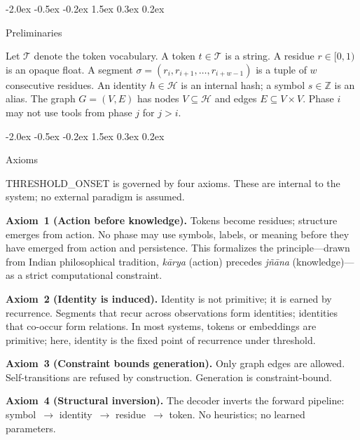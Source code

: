 \documentclass[10pt]{article}
\makeatletter
\renewcommand{\section}{\@startsection{section}{1}{\z@}%
  {-2.0ex \@plus -0.5ex \@minus -0.2ex}%
  {1.5ex \@plus 0.3ex \@minus 0.2ex}%
  {\large\bfseries\raggedright}}
\makeatother
\begin{document}
\section{Preliminaries}
\label{sec:prelim}

Let $\mathcal{T}$ denote the token vocabulary. A token $t \in \mathcal{T}$ is a string.
A residue $r \in [0, 1)$ is an opaque float. A segment
$\sigma = (r_i, r_{i+1}, \ldots, r_{i+w-1})$ is a tuple of $w$ consecutive residues.
An identity $h \in \mathcal{H}$ is an internal hash; a symbol $s \in \mathbb{Z}$ is an
alias. The graph $G = (V, E)$ has nodes $V \subseteq \mathcal{H}$ and edges
$E \subseteq V \times V$. Phase $i$ may not use tools from phase $j$ for $j > i$.

\section{Axioms}
\label{sec:axioms}

THRESHOLD\_ONSET is governed by four axioms. These are internal to the system;
no external paradigm is assumed.

\textbf{Axiom~1 (Action before knowledge).}
Tokens become residues; structure emerges from action. No phase may use symbols,
labels, or meaning before they have emerged from action and persistence. This formalizes
the principle---drawn from Indian philosophical tradition,
\textit{k\={a}rya} (action) precedes \textit{j\~{n}\={a}na} (knowledge)---as a
strict computational constraint.

\textbf{Axiom~2 (Identity is induced).}
Identity is not primitive; it is earned by recurrence. Segments that recur across
observations form identities; identities that co-occur form relations. In most systems,
tokens or embeddings are primitive; here, identity is the fixed point of recurrence
under threshold.

\textbf{Axiom~3 (Constraint bounds generation).}
Only graph edges are allowed. Self-transitions are refused by construction.
Generation is constraint-bound.

\textbf{Axiom~4 (Structural inversion).}
The decoder inverts the forward pipeline:
symbol~$\rightarrow$ identity~$\rightarrow$ residue~$\rightarrow$ token.
No heuristics; no learned parameters.
\end{document}
